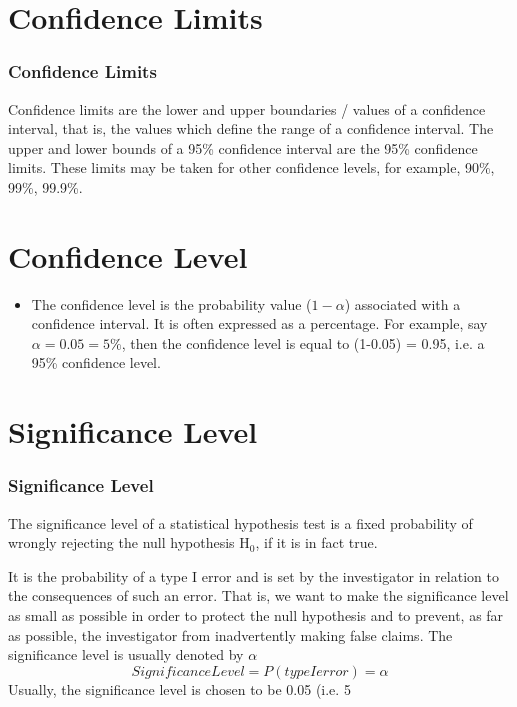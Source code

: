 \documentclass{beamer}
\begin{document}
\section{Confidence Limits}
\begin{frame}
\frametitle{Confidence Limits}
	Confidence limits are the lower and upper boundaries / values of a
	confidence interval, that is, the values which define the range of a
	confidence interval.
	The upper and lower bounds of a 95\% confidence interval are the
	95\% confidence limits. These limits may be taken for other
	confidence levels, for example, 90\%, 99\%, 99.9\%.

\end{frame}
\section{Confidence Level}
\begin{frame}
\begin{itemize}
	\item 	The confidence level is the probability value ($1-\alpha$) associated with a
	confidence interval.
	It is often expressed as a percentage.
	For example, say $\alpha = 0.05 = 5\%$, then the confidence level is equal
	to (1-0.05) = 0.95, i.e. a 95\% confidence level.
\end{itemize}


\end{frame}

\section{Significance Level}
\begin{frame}
\frametitle{Significance Level}	
	The significance level of a statistical hypothesis test is a fixed
	probability of wrongly rejecting the null hypothesis H$_0$, if it is in fact
	true.
\end{frame}
\begin{frame}It is the probability of a type I error and is set by the investigator
	in relation to the consequences of such an error. That is, we want to
	make the significance level as small as possible in order to protect
	the null hypothesis and to prevent, as far as possible, the
	investigator from inadvertently making false claims.
	The significance level is usually denoted by $\alpha$
	\[Significance Level = P(type I error) =\alpha\]
	Usually, the significance level is chosen to be 0.05 (i.e. 5%
\end{frame}
\end{document}

